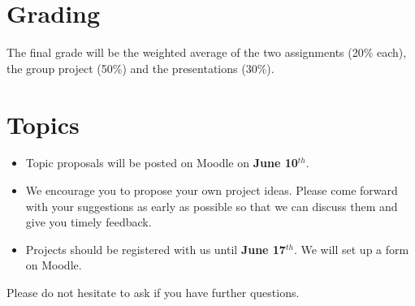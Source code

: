 \documentclass[]{article}
\begin{document}
\hypertarget{grading}{%
\section{Grading}\label{grading}}

The final grade will be the weighted average of the two assignments
(20\% each), the group project (50\%) and the presentations (30\%).

\hypertarget{topics}{%
\section{Topics}\label{topics}}

\begin{itemize}
\item
  Topic proposals will be posted on Moodle on \textbf{June 10\(^{th}\)}.
\item
  We encourage you to propose your own project ideas. Please come
  forward with your suggestions as early as possible so that we can
  discuss them and give you timely feedback.
\item
  Projects should be registered with us until \textbf{June 17\(^{th}\)}.
  We will set up a form on Moodle.
\end{itemize}

Please do not hesitate to ask if you have further questions.




\newpage
\singlespacing 
\end{document}
